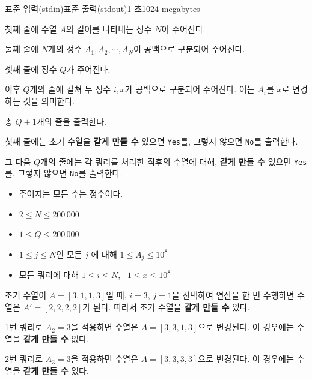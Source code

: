 \begin{problem}{\probtitle}{표준 입력(stdin)}{표준 출력(stdout)}{1 초}{1024 megabytes}


\InputFile

첫째 줄에 수열 $A$의 길이를 나타내는 정수 $N$이 주어진다.

둘째 줄에 $N$개의 정수 $A_1, A_2, \cdots, A_N$이 공백으로 구분되어 주어진다.

셋째 줄에 정수 $Q$가 주어진다.

이후 $Q$개의 줄에 걸쳐 두 정수 $i, x$가 공백으로 구분되어 주어진다. 이는 $A_i$를 $x$로 변경하는 것을 의미한다.

\OutputFile

총 $Q+1$개의 줄을 출력한다.

첫째 줄에는 초기 수열을 \textbf{같게 만들 수} 있으면 \texttt{Yes}를, 그렇지 않으면 \texttt{No}를 출력한다.

그 다음 $Q$개의 줄에는 각 쿼리를 처리한 직후의 수열에 대해, \textbf{같게 만들 수} 있으면 \texttt{Yes}를, 그렇지 않으면 \texttt{No}를 출력한다.

\Constraints

\begin{itemize}[topsep=0pt,noitemsep]
    \item 주어지는 모든 수는 정수이다.
    \item $2 \le N \le 200\,000$
    \item $1 \le Q \le 200\,000$
    \item $1 \le j \le N$인 모든 $j$ 에 대해 $1 \le A_j \le 10^8$
    \item 모든 쿼리에 대해 $1 \le i \le N$,~ $1 \le x \le 10^8$
\end{itemize}

\Example

\begin{example}
\end{example}

\Notes
초기 수열이 $A = [3, 1, 1, 3]$일 때, $i = 3$, $j = 1$을 선택하여 연산을 한 번 수행하면
수열은 $A' = [2, 2, 2, 2]$가 된다. 따라서 초기 수열을 \textbf{같게 만들 수} 있다.

1번 쿼리로 $A_2 = 3$을 적용하면 수열은 $A = [3, 3, 1, 3]$으로 변경된다.
이 경우에는 수열을 \textbf{같게 만들 수} 없다.

2번 쿼리로 $A_3 = 3$을 적용하면 수열은 $A = [3, 3, 3, 3]$으로 변경된다.
이 경우에는 수열을 \textbf{같게 만들 수} 있다.
\end{problem}
